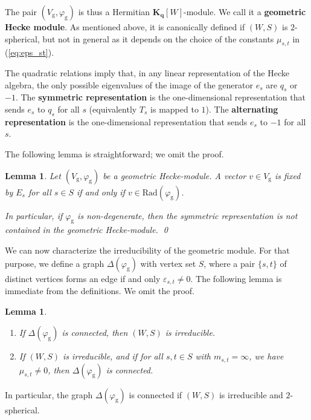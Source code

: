 \documentclass[12pt,a4paper]{amsproc}
\newtheorem{lemma}[theorem]{Lemma}
\theoremstyle{definition}
\newcommand{\KK}{\mathbf K}
\newcommand{\rg}{\mathrm g}
\begin{document}
	
The pair $(V_\rg, \varphi_\rg)$ is thus a Hermitian 	$\KK_{\mathbf q}[W]$-module. We call it a \textbf{geometric Hecke module}. As mentioned above, it is canonically defined if $(W, S)$ is $2$-spherical, but not in general as it depends on the choice of the constants $\mu_{s, t}$ in (\ref{eq:eps_st}). 
	
The quadratic relations imply that, in any linear representation of the Hecke algebra, the only possible eigenvalues of the image of the generator $e_s$ are $q_s$ or $-1$. The \textbf{symmetric representation} is the one-dimensional representation that sends $e_s$ to $q_s$ for all $s$ (equivalently $T_s$ is mapped to $1$). The \textbf{alternating representation} is the one-dimensional representation that sends $e_s$ to $-1$ for all $s$.  

The following lemma is straightforward; we omit the proof.  

\begin{lemma}\label{lem:symmetric-submodule}
Let  $(V_{\mathrm g}, \varphi_{\mathrm g})$ be a geometric Hecke-module. A vector $v \in V_{\mathrm g}$ is fixed by $E_s$ for all $s \in S$ if and only if $v \in \mathrm{Rad}(\varphi_{\mathrm g})$. 

In particular, if $\varphi_{\mathrm g}$ is non-degenerate, then the symmetric representation is not contained in the geometric Hecke-module. \qed
\end{lemma}

We can now characterize the irreducibility of the geometric module. For that purpose, we define a graph $\Delta(\varphi_\rg)$ with vertex set $S$, where a pair $\{s, t\}$ of distinct vertices forms an edge if and only $\varepsilon_{s, t} \neq 0$. The following lemma is immediate from the definitions. We omit the proof. 

\begin{lemma}\label{lem:connected}
\begin{enumerate}[label=(\roman*)]
\item If $\Delta(\varphi_\rg)$ is connected, then $(W, S)$ is irreducible. 

\item If $(W, S)$ is irreducible, and if for all $s, t \in S$ with $m_{s, t} = \infty$, we have $\mu_{s, t} \neq 0$, then $\Delta(\varphi_\rg)$ is connected.  
\end{enumerate}
\end{lemma}

In particular, the graph $\Delta(\varphi_\rg)$ is connected if $(W, S)$ is irreducible and $2$-spherical. 
\end{document}
